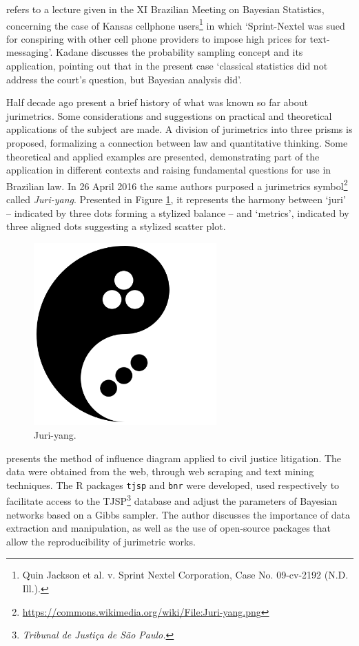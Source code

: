 \documentclass[a4paper]{exam}
\theoremstyle{plain}
\begin{document}
\cite{kadane2012probability} refers to a lecture given in the XI Brazilian Meeting on Bayesian Statistics, concerning the case of Kansas cellphone users\footnote{Quin Jackson et al. v. Sprint Nextel Corporation, Case No. 09-cv-2192 (N.D. Ill.).} in which `Sprint-Nextel was sued for conspiring with other cell phone providers to impose high prices for text-messaging'. Kadane discusses the probability sampling concept and its application, pointing out that in the present case `classical statistics did not address the court’s question, but Bayesian analysis did'.

Half decade ago \cite{zabala2014jurimetria} present a brief history of what was known so far about jurimetrics. Some considerations and suggestions on practical and theoretical applications of the subject are made. A division of jurimetrics into three prisms is proposed, formalizing a connection between law and quantitative thinking. Some theoretical and applied examples are presented, demonstrating part of the application in different contexts and raising fundamental questions for use in Brazilian law. In 26 April 2016 the same authors purposed a jurimetrics symbol\footnote{ \url{https://commons.wikimedia.org/wiki/File:Juri-yang.png}} called \textit{Juri-yang}. Presented in Figure \ref{jy}, it represents the harmony between `juri' -- indicated by three dots forming a stylized balance -- and `metrics', indicated by three aligned dots suggesting a stylized scatter plot. 

\begin{figure}[!h]
  \begin{center}
    \includegraphics[width=7cm]{jy.png}
  \caption{Juri-yang.}
  \label{jy}
  \end{center}
\end{figure}

\cite{trecenti2015diagramas} presents the method  of influence diagram applied to civil justice litigation. The data were obtained from the web, through web scraping and text mining techniques. The R packages \texttt{tjsp} and \texttt{bnr} were developed, used respectively to facilitate access to the TJSP\footnote{\textit{Tribunal de Justiça de São Paulo.}} database and adjust the parameters of Bayesian networks based on a Gibbs sampler. The author discusses the importance of data extraction and manipulation, as well as the use of open-source packages that allow the reproducibility of jurimetric works.
\end{document}
